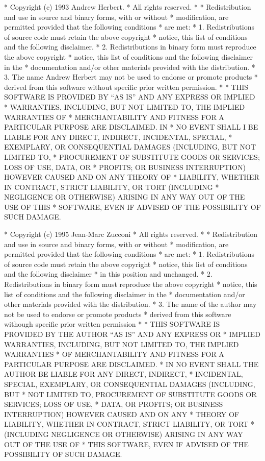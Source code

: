\begin{copyrightEnv}
 * Copyright (c) 1993 Andrew Herbert.
 * All rights reserved.
 *
 * Redistribution and use in source and binary forms, with or without
 * modification, are permitted provided that the following conditions
 * are met:
 * 1. Redistributions of source code must retain the above copyright
 *    notice, this list of conditions and the following disclaimer.
 * 2. Redistributions in binary form must reproduce the above copyright
 *    notice, this list of conditions and the following disclaimer in the
 *    documentation and/or other materials provided with the distribution.
 * 3. The name Andrew Herbert may not be used to endorse or promote products
 *    derived from this software without specific prior written permission.
 *
 * THIS SOFTWARE IS PROVIDED BY ``AS IS'' AND ANY EXPRESS OR IMPLIED
 * WARRANTIES, INCLUDING, BUT NOT LIMITED TO, THE IMPLIED WARRANTIES OF
 * MERCHANTABILITY AND FITNESS FOR A PARTICULAR PURPOSE ARE DISCLAIMED.  IN
 * NO EVENT SHALL I BE LIABLE FOR ANY DIRECT, INDIRECT, INCIDENTAL, SPECIAL,
 * EXEMPLARY, OR CONSEQUENTIAL DAMAGES (INCLUDING, BUT NOT LIMITED TO,
 * PROCUREMENT OF SUBSTITUTE GOODS OR SERVICES; LOSS OF USE, DATA, OR
 * PROFITS; OR BUSINESS INTERRUPTION) HOWEVER CAUSED AND ON ANY THEORY OF
 * LIABILITY, WHETHER IN CONTRACT, STRICT LIABILITY, OR TORT (INCLUDING
 * NEGLIGENCE OR OTHERWISE) ARISING IN ANY WAY OUT OF THE USE OF THIS
 * SOFTWARE, EVEN IF ADVISED OF THE POSSIBILITY OF SUCH DAMAGE.
\end{copyrightEnv}

\begin{copyrightEnv}
 * Copyright (c) 1995 Jean-Marc Zucconi
 * All rights reserved.
 *
 * Redistribution and use in source and binary forms, with or without
 * modification, are permitted provided that the following conditions
 * are met:
 * 1. Redistributions of source code must retain the above copyright
 *    notice, this list of conditions and the following disclaimer
 *    in this position and unchanged.
 * 2. Redistributions in binary form must reproduce the above copyright
 *    notice, this list of conditions and the following disclaimer in the
 *    documentation and/or other materials provided with the distribution.
 * 3. The name of the author may not be used to endorse or promote products
 *    derived from this software withough specific prior written permission
 *
 * THIS SOFTWARE IS PROVIDED BY THE AUTHOR ``AS IS'' AND ANY EXPRESS OR
 * IMPLIED WARRANTIES, INCLUDING, BUT NOT LIMITED TO, THE IMPLIED WARRANTIES
 * OF MERCHANTABILITY AND FITNESS FOR A PARTICULAR PURPOSE ARE DISCLAIMED.
 * IN NO EVENT SHALL THE AUTHOR BE LIABLE FOR ANY DIRECT, INDIRECT,
 * INCIDENTAL, SPECIAL, EXEMPLARY, OR CONSEQUENTIAL DAMAGES (INCLUDING, BUT
 * NOT LIMITED TO, PROCUREMENT OF SUBSTITUTE GOODS OR SERVICES; LOSS OF USE,
 * DATA, OR PROFITS; OR BUSINESS INTERRUPTION) HOWEVER CAUSED AND ON ANY
 * THEORY OF LIABILITY, WHETHER IN CONTRACT, STRICT LIABILITY, OR TORT
 * (INCLUDING NEGLIGENCE OR OTHERWISE) ARISING IN ANY WAY OUT OF THE USE OF
 * THIS SOFTWARE, EVEN IF ADVISED OF THE POSSIBILITY OF SUCH DAMAGE.
\end{copyrightEnv}

